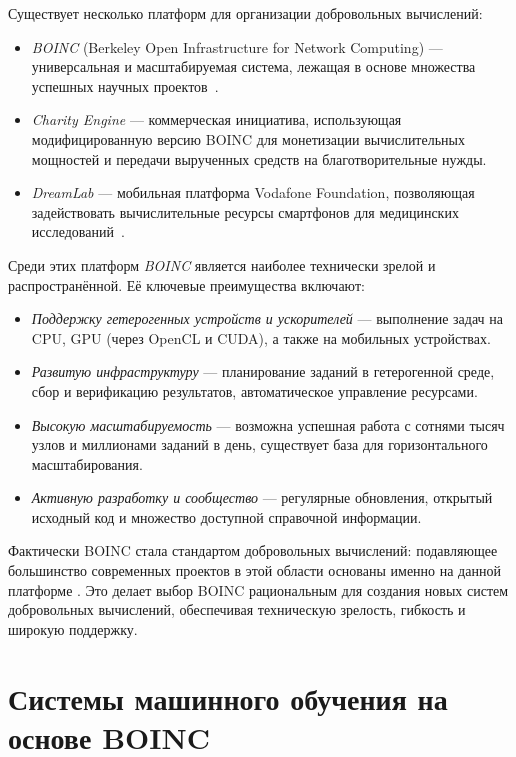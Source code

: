 \documentclass[a4paper,12pt]{extarticle}
\begin{document}
Существует несколько платформ для организации добровольных вычислений:
\begin{itemize}
    \item \textit{BOINC} (Berkeley Open Infrastructure for Network Computing) — универсальная и масштабируемая система, лежащая в основе множества успешных научных проектов~\cite{anderson2020boinc}. 
    \item \textit{Charity Engine} — коммерческая инициатива, использующая модифицированную версию BOINC для монетизации вычислительных мощностей и передачи вырученных средств на благотворительные нужды. 
    \item \textit{DreamLab} — мобильная платформа Vodafone Foundation, позволяющая задействовать вычислительные ресурсы смартфонов для медицинских исследований~\cite{Tapparello2015}.
\end{itemize}

Среди этих платформ \textit{BOINC} является наиболее технически зрелой и распространённой. Её ключевые преимущества включают:

\begin{itemize}
    \item \textit{Поддержку гетерогенных устройств и ускорителей} — выполнение задач на CPU, GPU (через OpenCL и CUDA), а также на мобильных устройствах.
    \item \textit{Развитую инфраструктуру} — планирование заданий в гетерогенной среде, сбор и верификацию результатов, автоматическое управление ресурсами.
    \item \textit{Высокую масштабируемость} — возможна успешная работа с сотнями тысяч узлов и миллионами заданий в день, существует база для горизонтального масштабирования.
    \item \textit{Активную разработку и сообщество} — регулярные обновления, открытый исходный код и множество доступной справочной информации.
\end{itemize}

Фактически BOINC стала стандартом добровольных вычислений: подавляющее большинство современных проектов в этой области основаны именно на данной платформе \cite{Mengistu2019}. Это делает выбор BOINC рациональным для создания новых систем добровольных вычислений, обеспечивая техническую зрелость, гибкость и широкую поддержку.

\section{Системы машинного обучения на основе BOINC}
\end{document}
